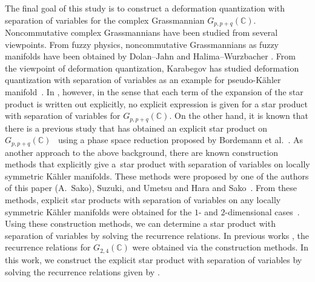 \documentclass[10pt,a4paper]{amsart}
\numberwithin{equation}{section}
\begin{document}
The final goal of this study is to construct a deformation quantization with separation of variables for the complex Grassmannian $G_{p,p+q}(\mathbb{C})$. Noncommutative complex Grassmannians have been studied from several viewpoints. From fuzzy physics, noncommutative Grassmannians as fuzzy manifolds have been obtained by Dolan--Jahn \cite{DJ} and Halima--Wurzbacher \cite{HW}. From the viewpoint of deformation quantization, Karabegov has studied deformation quantization with separation of variables as an example for pseudo-K\"ahler manifold~\cite{Kara4}.
In \cite{Kara4}, however, in the sense that each term of the expansion of the star product is written out explicitly, no explicit expression is given for a star product with separation of variables for $G_{p,p+q}(\mathbb{C})$.
On the other hand, it is known that there is a previous study that has obtained an explicit star product on~$ G_{p,p+q}(\mathbb{C})$~\cite{Schir} using a phase space reduction proposed by Bordemann et al.~\cite{BBEW}. As another approach to the above background, there are known construction methods that explicitly give a~star product with separation of variables on locally symmetric K\"ahler manifolds. These methods were proposed by one of the authors of this paper (A.~Sako), Suzuki, and Umetsu \cite{SSU1,SSU2} and Hara and Sako~\cite{HS1,HS2}.
From these methods, explicit star products with separation of variables on any locally symmetric K\"ahler manifolds were obtained for the $1$- and $2$-dimensional cases~\cite{HS1,HS2,OS_Varna,OS_jrnl}.
Using these construction methods, we can determine a star product with separation of variables by solving the recurrence relations. In previous works \cite{HS1,HS2}, the recurrence relations for $G_{2,4}(\mathbb{C})$ were obtained via the construction methods. In this work, we construct the explicit star product with separation of variables by solving the recurrence relations given by \cite{HS1,HS2}.
\end{document}
